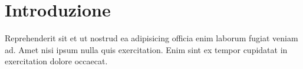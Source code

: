\chapter{Introduzione}

Reprehenderit sit et ut nostrud ea adipisicing officia enim laborum fugiat veniam ad. Amet nisi ipsum nulla quis exercitation. Enim sint ex tempor cupidatat in exercitation dolore occaecat.